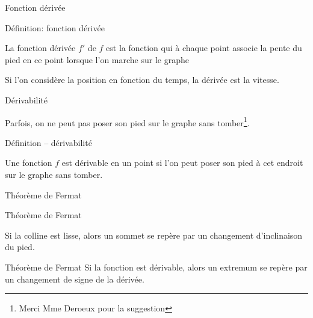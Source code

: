 \documentclass{beamer}
\begin{document}
\begin{frame}
    {Fonction dérivée}

    \begin{exampleblock}
        {Définition: fonction dérivée}

        La fonction dérivée $f'$ de $f$ est la fonction qui à chaque point
        associe la pente du pied en ce point lorsque l'on marche sur le graphe
    \end{exampleblock}
    \pause{}

    \begin{plot}{0.25}{-10}{-2}{10}{10}
    \end{plot}
    Si l'on considère la position en fonction du temps,
    la dérivée est la vitesse.
\end{frame}

\begin{frame}
    {Dérivabilité}

    Parfois,
    on ne peut pas poser son pied sur le graphe sans tomber\footnote{Merci Mme Deroeux pour la suggestion}.
    \begin{plot}{0.25}{-10}{-1}{10}{10}
    \end{plot}
    \pause{}

    \begin{exampleblock}
        {Définition -- dérivabilité}

        Une fonction $f$ est dérivable en un point si l'on peut poser son pied à cet endroit sur le graphe sans tomber.
    \end{exampleblock}
\end{frame}

\begin{frame}
    {Théorème de Fermat}

    \begin{exampleblock}
        {Théorème de Fermat}

        Si la colline est lisse,
        alors un sommet se repère par un changement d'inclinaison du pied.
    \end{exampleblock}
    \pause{}

    \begin{alertblock}
        {Théorème de Fermat}
        Si la fonction est dérivable,
        alors un extremum se repère par un changement de signe de la dérivée.
    \end{alertblock}
\end{frame}
\end{document}
